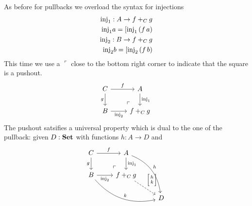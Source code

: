 As before for pullbacks we overload the syntax for injections
\begin{align*}
\mathrm{inj}_1 : A \to f +_C g  \\
\mathrm{inj}_1 a = [ \mathrm{inj}_1\,(f\,a) \\
\mathrm{inj}_2 : B \to f +_C g  \\
\mathrm{inj}_2 b = [ \mathrm{inj}_2\,(f\,b) 
\end{align*}
This time we use a $\ulcorner$ close to the bottom right corner to indicate that the square is a pushout.
\[\begin{tikzcd}
C \arrow[r,"f"]\arrow[d,"g" left] 
\arrow[dr, phantom, "\ulcorner", very near end]
& A \arrow[d,"\inj_1"]\\
B  \arrow[r,"\inj_2" below] & f +_C g
\end{tikzcd}\]
The pushout satsifies a universal property which is dual to the one of the pullback: given $D : \mathbf{Set}$ with functions $h : A \to D$ and 
\[\begin{tikzcd}
C \arrow[r,"f"]\arrow[d,"g" left] 
\arrow[dr, phantom, "\ulcorner", very near end]
& A \arrow[d,"\inj_1"]  \arrow[rdd,bend left,"h"]\\
B  \arrow[r,"\inj_2" below] \arrow[drr,bend right,"k"] & f +_C g 
\arrow[dr,dashrightarrow,"\case{h}{k}"]\\
& & D
\end{tikzcd}\]